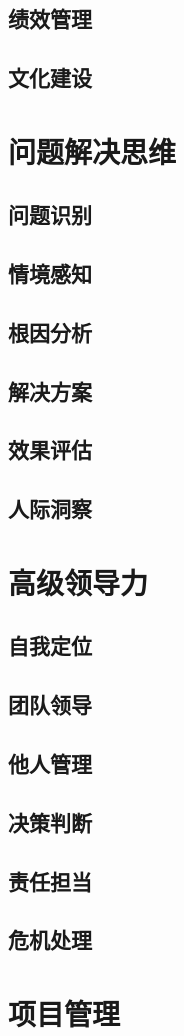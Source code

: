 \documentclass[openany,10pt,UTF8]{ctexbook}
\begin{document}
\chapter{绩效管理}

\chapter{文化建设}


\part{问题解决思维}
\chapter{问题识别}

\chapter{情境感知}

\chapter{根因分析}

\chapter{解决方案}

\chapter{效果评估}

\chapter{人际洞察}


\part{高级领导力}
\chapter{自我定位}

\chapter{团队领导}

\chapter{他人管理}

\chapter{决策判断}

\chapter{责任担当}

\chapter{危机处理}


\part{项目管理}
\end{document}
